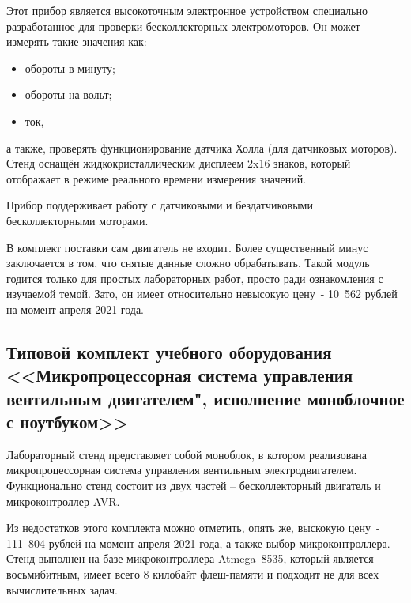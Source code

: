 Этот прибор является высокоточным электронное устройством специально разработанное для 
проверки бесколлекторных электромоторов. Он может измерять такие значения как:

\begin{itemize}
  \item обороты в минуту;
  \item обороты на вольт;
  \item ток,
\end{itemize}

а также, проверять функционирование датчика Холла (для датчиковых моторов). 
Стенд оснащён жидкокристаллическим дисплеем 2x16 знаков, который отображает в 
режиме реального времени измерения значений.

Прибор поддерживает работу с датчиковыми и бездатчиковыми бесколлекторными моторами.

В комплект поставки сам двигатель не входит. Более существенный минус заключается в том, что 
снятые данные сложно обрабатывать. Такой модуль
годится только для простых лабораторных работ, просто ради ознакомления с изучаемой темой. Зато, 
он имеет относительно невысокую цену~- 10~562 рублей на момент апреля 2021 года.

\subsection{
  Типовой комплект учебного оборудования <<Микропроцессорная система управления вентильным двигателем", исполнение моноблочное с ноутбуком>>
}


Лабораторный стенд представляет собой моноблок, в котором реализована микропроцессорная 
система управления вентильным электродвигателем. Функционально стенд состоит из двух 
частей – бесколлекторный двигатель и микроконтроллер AVR.

Из недостатков этого комплекта можно отметить, опять же, выскокую цену~- 111~804 рублей на 
момент апреля 2021 года, а также выбор микроконтроллера. Стенд выполнен на базе 
микроконтроллера Atmega~8535, который является восьмибитным, имеет всего 8 килобайт 
флеш-памяти и подходит не для всех вычислительных задач.